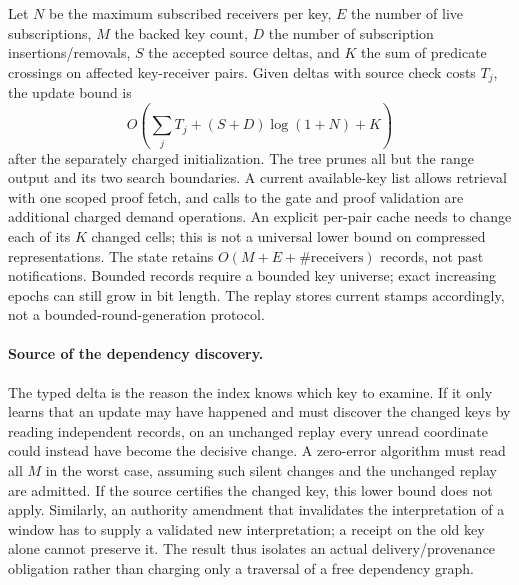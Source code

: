 \documentclass[11pt]{article}
\begin{document}
Let $N$ be the maximum subscribed receivers per key, $E$ the number of live subscriptions, $M$ the backed key count, $D$ the number of subscription insertions/removals, $S$ the accepted source deltas, and $K$ the sum of predicate crossings on affected key-receiver pairs. Given deltas with source check costs $T_j$, the update bound is
\[
 O\!\left(\sum_j T_j+(S+D)\log(1+N)+K\right)
\]
after the separately charged initialization. The tree prunes all but the range output and its two search boundaries. A current available-key list allows retrieval with one scoped proof fetch, and calls to the gate and proof validation are additional charged demand operations. An explicit per-pair cache needs to change each of its $K$ changed cells; this is not a universal lower bound on compressed representations. The state retains $O(M+E+\#\text{receivers})$ records, not past notifications. Bounded records require a bounded key universe; exact increasing epochs can still grow in bit length. The replay stores current stamps accordingly, not a bounded-round-generation protocol.

\paragraph{Source of the dependency discovery.}
The typed delta is the reason the index knows which key to examine. If it only learns that an update may have happened and must discover the changed keys by reading independent records, on an unchanged replay every unread coordinate could instead have become the decisive change. A zero-error algorithm must read all $M$ in the worst case, assuming such silent changes and the unchanged replay are admitted. If the source certifies the changed key, this lower bound does not apply. Similarly, an authority amendment that invalidates the interpretation of a window has to supply a validated new interpretation; a receipt on the old key alone cannot preserve it. The result thus isolates an actual delivery/provenance obligation rather than charging only a traversal of a free dependency graph.
\end{document}
